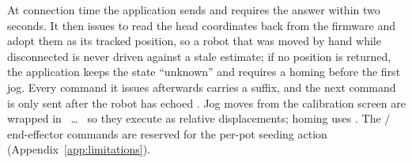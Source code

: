 At connection time the application sends  and requires the
 answer within two seconds. It then issues  to read
the head coordinates back from the firmware and adopt them as its tracked
position, so a robot that was moved by hand while disconnected is never driven
against a stale estimate; if no position is returned, the application keeps the
state ``unknown'' and requires a homing before the first jog. Every command it
issues afterwards carries a  suffix, and the next command is
only sent after the robot has echoed . Jog moves from the calibration
screen are wrapped in ~\dots~ so they execute as relative
displacements; homing uses . The / end-effector
commands are reserved for the per-pot seeding action
(Appendix~\ref{app:limitations}).

